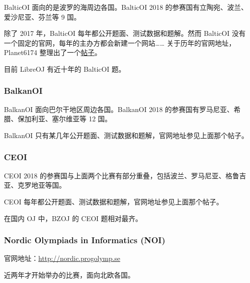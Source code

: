 BalticOI 面向的是波罗的海周边各国。BalticOI 2018 的参赛国有立陶宛、波兰、爱沙尼亚、芬兰等 9 国。

除了 2017 年，BalticOI 每年都公开题面、测试数据和题解。然而 BalticOI 没有一个固定的官网，每年的主办方都会新建一个网站…… 关于历年的官网地址，Planet6174 整理出了一个\href{https://loj.ac/article/416}{帖子}。

目前 LibreOJ 有近十年的 BalticOI 题。

\subsubsection{BalkanOI}

BalkanOI 面向巴尔干地区周边各国。BalkanOI 2018 的参赛国有罗马尼亚、希腊、保加利亚、塞尔维亚等 12 国。

BalkanOI 只有某几年公开题面、测试数据和题解，官网地址参见上面那个帖子。

\subsubsection{CEOI}

CEOI 2018 的参赛国与上面两个比赛有部分重叠，包括波兰、罗马尼亚、格鲁吉亚、克罗地亚等国。

CEOI 每年都公开题面、测试数据和题解，官网地址参见上面那个帖子。

在国内 OJ 中，BZOJ 的 CEOI 题相对最齐。

\subsubsection{Nordic Olympiads in Informatics (NOI)}

官网地址：\url{http://nordic.progolymp.se}

近两年才开始举办的比赛，面向北欧各国。
